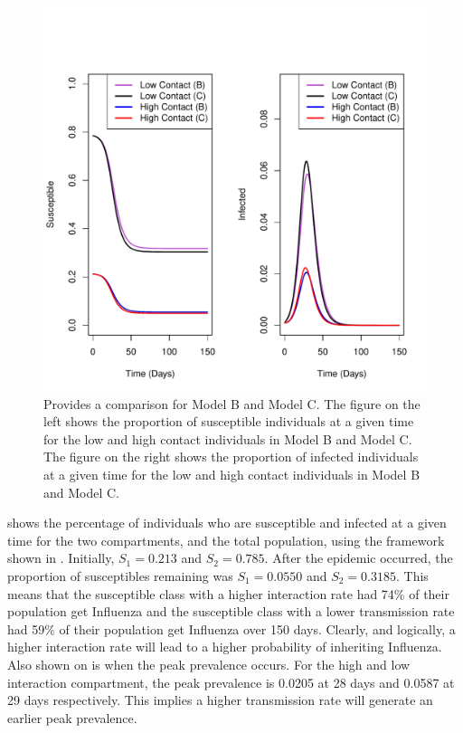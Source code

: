 \documentclass[a4paper, 12pt, journal]{ieeeconf}\usepackage[]{graphicx}\usepackage[]{color}
\begin{document}
\begin{figure}[thpb]
\centering
\includegraphics[scale = 0.44]{figure/R_BC-1.pdf}
\caption{Provides a comparison for Model B and Model C. The figure on the left shows the proportion of susceptible individuals at a given time for the low and high contact individuals in Model B and Model C. The figure on the right shows the proportion of infected individuals at a given time for the low and high contact individuals in Model B and Model C.}\label{F:ModelC}
\end{figure}

 shows the percentage of individuals who are susceptible and infected at a given time for the two compartments, and the total population, using the framework shown in . Initially, $S_1 = 0.213$ and $S_2 = 0.785$. After the epidemic occurred, the proportion of susceptibles remaining was $S_1 = 0.0550$ and $S_2 = 0.3185$. This means that the susceptible class with a higher interaction rate had 74\% of their population get Influenza and the susceptible class with a lower transmission rate had 59\% of their population get Influenza over 150 days. Clearly, and logically, a higher interaction rate will lead to a higher probability of inheriting Influenza. Also shown on  is when the peak prevalence occurs. For the high and low interaction compartment, the peak prevalence is 0.0205 at 28 days and 0.0587 at 29 days respectively. This implies a higher transmission rate will generate an earlier peak prevalence. 
\end{document}
